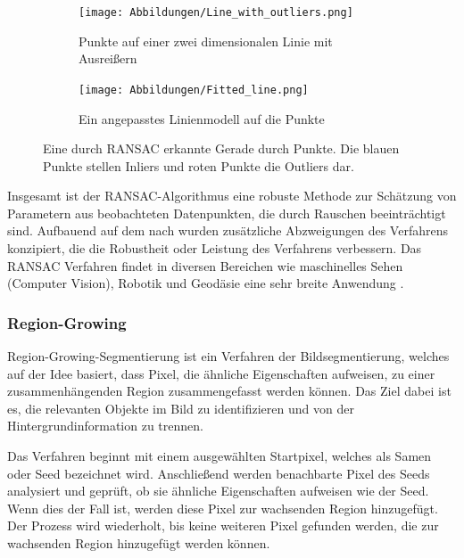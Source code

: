 \begin{figure}[!b]
	\centering
	\begin{subfigure}{0.43\textwidth}
		\texttt{[image: Abbildungen/Line\_with\_outliers.png]}
		\centering
		\caption[Linie mit Ausreißer]{Punkte auf einer zwei dimensionalen Linie mit Ausreißern}
		\label{fig: line_with_outliers}
	\end{subfigure}
	\hfill
	\begin{subfigure}{0.43\textwidth}
		\texttt{[image: Abbildungen/Fitted\_line.png]}
		\centering
		\caption[Linienmodell für eine Linie]{Ein angepasstes Linienmodell auf die Punkte}
		\label{fig: fitted_line}
	\end{subfigure}
	\caption[Visualisierung des RANSAC-Verfahrens]{Eine durch RANSAC erkannte Gerade durch Punkte. Die blauen Punkte stellen Inliers und roten Punkte die Outliers dar.}
	\label{fig: ransac_line}
\end{figure}

Insgesamt ist der RANSAC-Algorithmus eine robuste Methode zur Schätzung von Parametern aus beobachteten Datenpunkten, die durch Rauschen beeinträchtigt sind. Aufbauend auf dem nach \textcite{fischler_random_1981} wurden zusätzliche Abzweigungen des Verfahrens konzipiert, die die Robustheit oder Leistung des Verfahrens verbessern. Das RANSAC Verfahren findet in diversen Bereichen wie maschinelles Sehen (Computer Vision), Robotik und Geodäsie eine sehr breite Anwendung \autocite[2]{martinez-otzeta_ransac_2023}.

\subsubsection{Region-Growing}
Region-Growing-Segmentierung ist ein Verfahren der Bildsegmentierung, welches auf der Idee basiert, dass Pixel, die ähnliche Eigenschaften aufweisen, zu einer zusammenhängenden Region zusammengefasst werden können. Das Ziel dabei ist es, die relevanten Objekte im Bild zu identifizieren und von der Hintergrundinformation zu trennen. \autocite[641]{adams_seeded_1994}

Das Verfahren beginnt mit einem ausgewählten Startpixel, welches als Samen oder Seed bezeichnet wird. Anschließend werden benachbarte Pixel des Seeds analysiert und geprüft, ob sie ähnliche Eigenschaften aufweisen wie der Seed. Wenn dies der Fall ist, werden diese Pixel zur wachsenden Region hinzugefügt. Der Prozess wird wiederholt, bis keine weiteren Pixel gefunden werden, die zur wachsenden Region hinzugefügt werden können.\autocite[641-642]{adams_seeded_1994}

